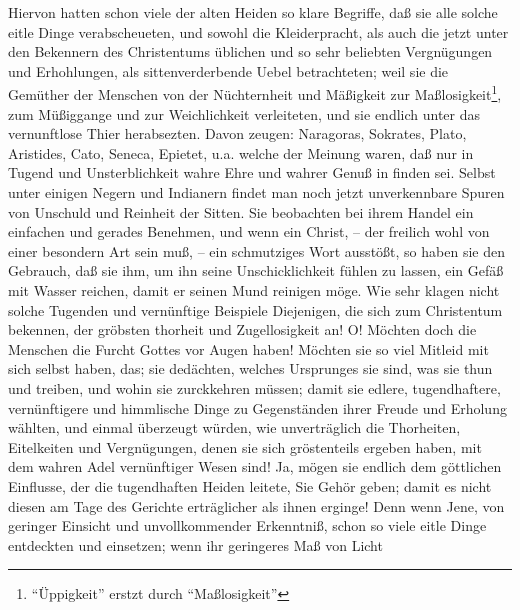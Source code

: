 Hiervon hatten schon viele der alten Heiden so klare Begriffe, daß sie alle
solche eitle Dinge verabscheueten, und sowohl die Kleiderpracht, als auch die
jetzt unter den Bekennern des Christentums üblichen und so sehr beliebten
Vergnügungen und Erhohlungen, als sittenverderbende Uebel betrachteten; weil sie
die Gemüther der Menschen von der Nüchternheit und Mäßigkeit zur Maßlosigkeit\footnote{"`Üppigkeit"' erstzt durch "`Maßlosigkeit"'}, zum
Müßiggange und zur Weichlichkeit verleiteten, und sie endlich unter das
vernunftlose Thier herabsezten. Davon zeugen: Naragoras, Sokrates, Plato,
Aristides, Cato, Seneca, Epietet, u.a. welche der Meinung waren, daß nur in
Tugend und Unsterblichkeit wahre Ehre und wahrer Genuß in finden sei. Selbst
unter einigen Negern und Indianern findet man noch jetzt unverkennbare Spuren
von Unschuld und Reinheit der Sitten. Sie beobachten bei ihrem Handel ein
einfachen und gerades Benehmen, und wenn ein Christ, -- der freilich wohl von
einer besondern Art sein muß, -- ein schmutziges Wort ausstößt, so haben sie den
Gebrauch, daß sie ihm, um ihn seine Unschicklichkeit fühlen zu lassen, ein
Gefäß mit Wasser reichen, damit er seinen Mund reinigen möge. Wie sehr klagen
nicht solche Tugenden und vernünftige Beispiele Diejenigen, die sich zum
Christentum bekennen, der gröbsten thorheit und Zugellosigkeit an! O! Möchten
doch die Menschen die Furcht Gottes vor Augen haben! Möchten sie so viel Mitleid
mit sich selbst haben, das; sie dedächten, welches Ursprunges sie sind, was sie
thun und treiben, und wohin sie zurckkehren müssen; damit sie edlere,
tugendhaftere, vernünftigere und himmlische Dinge zu Gegenständen ihrer Freude
und Erholung wählten, und einmal überzeugt würden, wie unverträglich die
Thorheiten, Eitelkeiten und Vergnügungen, denen sie sich gröstenteils ergeben
haben, mit dem wahren Adel vernünftiger Wesen sind! Ja, mögen sie endlich dem
göttlichen Einflusse, der die tugendhaften Heiden leitete, Sie Gehör geben;
damit es nicht diesen am Tage des Gerichte erträglicher als ihnen erginge! Denn
wenn Jene, von geringer Einsicht und unvollkommender Erkenntniß, schon so viele
eitle Dinge entdeckten und einsetzen; wenn ihr geringeres Maß von Licht
